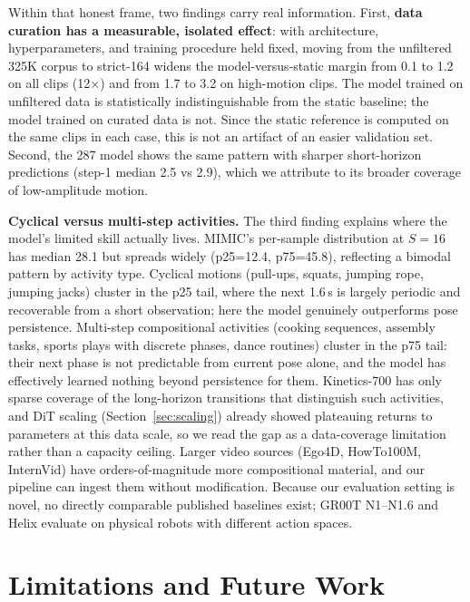 \documentclass[letterpaper, 10pt, conference]{ieeeconf}
\begin{document}
Within that honest frame, two findings carry real information. First, \textbf{data curation has a measurable, isolated effect}: with architecture, hyperparameters, and training procedure held fixed, moving from the unfiltered 325K corpus to strict-164 widens the model-versus-static margin from 0.1\textdegree{} to 1.2\textdegree{} on all clips (12$\times$) and from 1.7\textdegree{} to 3.2\textdegree{} on high-motion clips. The model trained on unfiltered data is statistically indistinguishable from the static baseline; the model trained on curated data is not. Since the static reference is computed on the same clips in each case, this is not an artifact of an easier validation set. Second, the 287 model shows the same pattern with sharper short-horizon predictions (step-1 median 2.5\textdegree{} vs 2.9\textdegree{}), which we attribute to its broader coverage of low-amplitude motion.

\textbf{Cyclical versus multi-step activities.} The third finding explains where the model's limited skill actually lives. MIMIC's per-sample distribution at $S{=}16$ has median 28.1\textdegree{} but spreads widely (p25=12.4\textdegree{}, p75=45.8\textdegree{}), reflecting a bimodal pattern by activity type. Cyclical motions (pull-ups, squats, jumping rope, jumping jacks) cluster in the p25 tail, where the next 1.6\,s is largely periodic and recoverable from a short observation; here the model genuinely outperforms pose persistence. Multi-step compositional activities (cooking sequences, assembly tasks, sports plays with discrete phases, dance routines) cluster in the p75 tail: their next phase is not predictable from current pose alone, and the model has effectively learned nothing beyond persistence for them. Kinetics-700 has only sparse coverage of the long-horizon transitions that distinguish such activities, and DiT scaling (Section~\ref{sec:scaling}) already showed plateauing returns to parameters at this data scale, so we read the gap as a data-coverage limitation rather than a capacity ceiling. Larger video sources (Ego4D, HowTo100M, InternVid) have orders-of-magnitude more compositional material, and our pipeline can ingest them without modification. Because our evaluation setting is novel, no directly comparable published baselines exist; GR00T N1--N1.6 and Helix evaluate on physical robots with different action spaces.

\section{Limitations and Future Work}
\label{sec:limitations}
\end{document}
